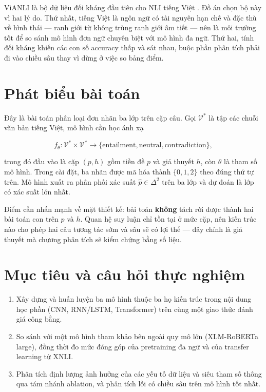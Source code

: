 \documentclass[12pt,a4paper,oneside]{report}
\begin{document}
ViANLI là bộ dữ liệu đối kháng đầu tiên cho NLI tiếng Việt \cite{vianli}. Đồ án chọn bộ
này vì hai lý do. Thứ nhất, tiếng Việt là ngôn ngữ có tài nguyên hạn chế và đặc thù về
hình thái --- ranh giới từ không trùng ranh giới âm tiết --- nên là môi trường tốt để so
sánh mô hình đơn ngữ chuyên biệt với mô hình đa ngữ. Thứ hai, tính đối kháng khiến các con
số accuracy thấp và sát nhau, buộc phần phân tích phải đi vào chiều sâu thay vì dừng ở
việc so bảng điểm.

\section{Phát biểu bài toán}

Đây là bài toán phân loại đơn nhãn ba lớp trên cặp câu. Gọi $\mathcal{V}^{*}$ là tập các
chuỗi văn bản tiếng Việt, mô hình cần học ánh xạ

\begin{equation}
  f_{\theta}: \mathcal{V}^{*} \times \mathcal{V}^{*} \rightarrow
  \{\text{entailment}, \text{neutral}, \text{contradiction}\},
\end{equation}

trong đó đầu vào là cặp $(p, h)$ gồm tiền đề $p$ và giả thuyết $h$, còn $\theta$ là tham
số mô hình. Trong cài đặt, ba nhãn được mã hóa thành $\{0, 1, 2\}$ theo đúng thứ tự trên.
Mô hình xuất ra phân phối xác suất $\hat{p} \in \Delta^{2}$ trên ba lớp và dự đoán là lớp
có xác suất lớn nhất.

Điểm cần nhấn mạnh về mặt thiết kế: bài toán \textbf{không} tách rời được thành hai bài
toán con trên $p$ và $h$. Quan hệ suy luận chỉ tồn tại ở mức cặp, nên kiến trúc nào cho
phép hai câu tương tác sớm và sâu sẽ có lợi thế --- đây chính là giả thuyết mà chương phân
tích sẽ kiểm chứng bằng số liệu.

\section{Mục tiêu và câu hỏi thực nghiệm}

\begin{enumerate}[leftmargin=*,itemsep=3pt]
  \item Xây dựng và huấn luyện ba mô hình thuộc ba họ kiến trúc trong nội dung học phần
        (CNN, RNN/LSTM, Transformer) trên cùng một giao thức đánh giá công bằng.
  \item So sánh với một mô hình tham khảo bên ngoài quy mô lớn (XLM-RoBERTa large), đồng
        thời đo mức đóng góp của pretraining đa ngữ và của transfer learning từ XNLI.
  \item Phân tích định lượng ảnh hưởng của các yếu tố dữ liệu và siêu tham số thông qua
        tám nhánh ablation, và phân tích lỗi có chiều sâu trên mô hình tốt nhất.
\end{enumerate}
\end{document}

